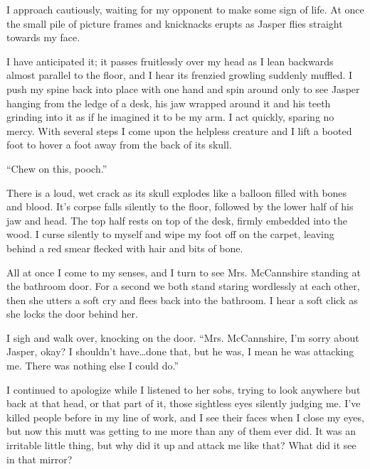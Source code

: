 I approach cautiously, waiting for my opponent to make some sign of
life. At once the small pile of picture frames and knicknacks
erupts as Jasper flies straight towards my face.



I have anticipated it; it passes fruitlessly over my head as I lean
backwards almost parallel to the floor, and I hear its frenzied
growling suddenly muffled. I push my spine back into place with one
hand and spin around only to see Jasper hanging from the ledge of a
desk, his jaw wrapped around it and his teeth grinding into it as
if he imagined it to be my arm. I act quickly, sparing no mercy.
With several steps I come upon the helpless creature and I lift a
booted foot to hover a foot away from the back of its skull.



``Chew on this, pooch.''



There is a loud, wet crack as its skull explodes like a balloon
filled with bones and blood. It's corpse falls silently to the
floor, followed by the lower half of his jaw and head. The top half
rests on top of the desk, firmly embedded into the wood. I curse
silently to myself and wipe my foot off on the carpet, leaving
behind a red smear flecked with hair and bits of bone.



All at once I come to my senses, and I turn to see Mrs. McCannshire
standing at the bathroom door. For a second we both stand staring
wordlessly at each other, then she utters a soft cry and flees back
into the bathroom. I hear a soft click as she locks the door behind
her.



I sigh and walk over, knocking on the door. ``Mrs. McCannshire, I'm
sorry about Jasper, okay? I shouldn't have{\ldots}done that, but he was,
I mean he was attacking me. There was nothing else I could
do.''



I continued to apologize while I listened to her sobs, trying to
look anywhere but back at that head, or that part of it, those
sightless eyes silently judging me. I've killed people before in my
line of work, and I see their faces when I close my eyes, but now
this mutt was getting to me more than any of them ever did. It was
an irritable little thing, but why did it up and attack me like
that? What did it see in that mirror?



